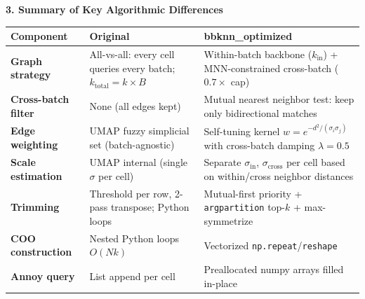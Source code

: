 \documentclass[8pt]{article}
\begin{document}
\newpage


{\large\bfseries 3. Summary of Key Algorithmic Differences}

\vspace{3pt}

\renewcommand{\arraystretch}{1.3}
\begin{table}[ht]
\centering
\small
\begin{tabular}{@{}p{2.6cm} p{5.5cm} p{6.3cm}@{}}
\toprule
\textbf{Component} & \textbf{Original} & \textbf{bbknn\_optimized} \\
\midrule
\textbf{Graph strategy} &
    All-vs-all: every cell queries every batch; $k_\text{total} = k \times B$ &
    \textcolor{added}{Within-batch backbone ($k_\text{in}$) + MNN-constrained cross-batch ($0.7 \times$ cap)} \\
\addlinespace

\textbf{Cross-batch filter} &
    None (all edges kept) &
    \textcolor{added}{Mutual nearest neighbor test: keep only bidirectional matches} \\
\addlinespace

\textbf{Edge weighting} &
    UMAP fuzzy simplicial set (batch-agnostic) &
    \textcolor{added}{Self-tuning kernel $w = e^{-d^2/(\sigma_i \sigma_j)}$ with cross-batch damping $\lambda{=}0.5$} \\
\addlinespace

\textbf{Scale estimation} &
    UMAP internal (single $\sigma$ per cell) &
    \textcolor{added}{Separate $\sigma_\text{in}$, $\sigma_\text{cross}$ per cell based on within/cross neighbor distances} \\
\addlinespace

\textbf{Trimming} &
    Threshold per row, 2-pass transpose; Python loops &
    \textcolor{added}{Mutual-first priority + \texttt{argpartition} top-$k$ + max-symmetrize} \\
\addlinespace

\textbf{COO construction} &
    Nested Python loops $O(Nk)$ &
    \textcolor{added}{Vectorized \texttt{np.repeat}/\texttt{reshape}} \\
\addlinespace

\textbf{Annoy query} &
    List append per cell &
    \textcolor{added}{Preallocated numpy arrays filled in-place} \\

\bottomrule
\end{tabular}
\end{table}
\end{document}
